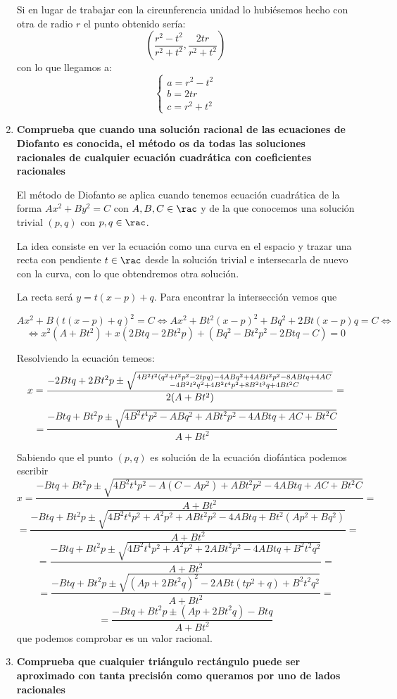 \begin{problem}[9]
\begin{enumerate}
Si en lugar de trabajar con la circunferencia unidad lo hubiésemos hecho con otra de radio $r$ el punto obtenido sería:
\[\left(\frac{r^2-t^2}{r^2+t^2}, \frac{2tr}{r^2+t^2}\right)\]
con lo que llegamos a:
\[\left\{\begin{array}{l}
a=r^2-t^2 \\
b=2tr\\
c=r^2+t^2
\end{array}\right.\]

\item \textbf{Comprueba que cuando una solución racional de las ecuaciones de Diofanto es conocida, el método os da todas las soluciones racionales de cualquier ecuación cuadrática con coeficientes racionales}

El método de Diofanto se aplica cuando tenemos ecuación cuadrática de la forma $Ax^2+By^2=C$ con $A,B,C \in \rac$ y de la que conocemos una solución trivial $(p,q)$ con $p,q \in \rac$.

La idea consiste en ver la ecuación como una curva en el espacio y trazar una recta con pendiente $t \in \rac$ desde la solución trivial e intersecarla de nuevo con la curva, con lo que obtendremos otra solución.

La recta será $y=t(x-p)+q$. Para encontrar la intersección vemos que

\[Ax^2 + B\left(t(x-p)+q\right)^2 = C \iff Ax^2+Bt^2(x-p)^2 +Bq^2+2Bt(x-p)q=C \iff\]
\[\iff x^2 (A+Bt^2) + x (2Btq-2Bt^2p) + \left(Bq^2-Bt^2p^2-2Btq-C\right) = 0\]

Resolviendo la ecuación temeos:
\[x= \frac{-2Btq+2Bt^2p \pm \sqrt{4B^2t^2(q^2+t^2p^2-2tpq)-4ABq^2+4ABt^2p^2-8ABtq+4AC\atop -4B^2t^2q^2+4B^2t^4p^2+8B^2t^3q+4Bt^2C}}{2(A+Bt^2)}=\]
\[=\frac{-Btq+Bt^2p \pm \sqrt{4B^2t^4p^2-ABq^2+ABt^2p^2-4ABtq+AC +Bt^2C}}{A+Bt^2}\]

Sabiendo que el punto $(p,q)$ es solución de la ecuación diofántica podemos escribir
\[x=\frac{-Btq+Bt^2p \pm \sqrt{4B^2t^4p^2-A(C-Ap^2)+ABt^2p^2-4ABtq+AC +Bt^2C}}{A+Bt^2}=\]
\[=\frac{-Btq+Bt^2p \pm \sqrt{4B^2t^4p^2+A^2p^2+ABt^2p^2-4ABtq +Bt^2(Ap^2+Bq^2)}}{A+Bt^2}=\]
\[=\frac{-Btq+Bt^2p \pm \sqrt{4B^2t^4p^2+A^2p^2+2ABt^2p^2-4ABtq +B^2t^2q^2}}{A+Bt^2}=\]
\[=\frac{-Btq+Bt^2p \pm \sqrt{(Ap+2Bt^2q)^2-2ABt(tp^2+q)+B^2t^2q^2}}{A+Bt^2}=\]
\[=\frac{-Btq+Bt^2p \pm (Ap+2Bt^2q)-Btq}{A+Bt^2}\]
que podemos comprobar es un valor racional.


\item \textbf{Comprueba que cualquier triángulo rectángulo puede ser aproximado con tanta precisión como queramos por uno de lados racionales}

\end{enumerate}


\end{problem}

